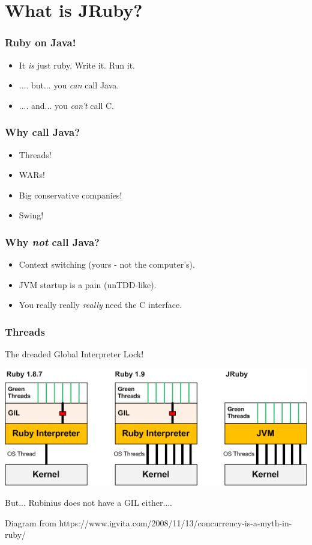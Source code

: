 




\begin{frame}
  \titlepage
\end{frame}

\section{What is JRuby?}
\begin{frame}\frametitle{Ruby on Java!}
\begin{itemize}
  \item It \emph{is} just ruby. Write it. Run it.
  \item .... but... you \emph{can} call Java.
  \item .... and... you \emph{can't} call C.
\end{itemize}
\end{frame}
\begin{frame}\frametitle{Why call Java?}
  \begin{itemize}
    \item Threads!
    \item WARs!
    \item Big conservative companies!
    \item Swing!
  \end{itemize}
\end{frame}
\begin{frame}\frametitle{Why \emph{not} call Java?}
  \begin{itemize}
    \item Context switching (yours - not the computer's).
    \item JVM startup is a pain (unTDD-like).
    \item You really really \emph{really} need the C interface.
  \end{itemize}
\end{frame}
\begin{frame}\frametitle{Threads}
  The dreaded Global Interpreter Lock!
  \begin{center}
  \includegraphics[scale=.5]{diagrams/ruby-gil.png}
  \end{center}
  But... Rubinius does not have a GIL either....


{\tiny Diagram from https://www.igvita.com/2008/11/13/concurrency-is-a-myth-in-ruby/}
\end{frame}
